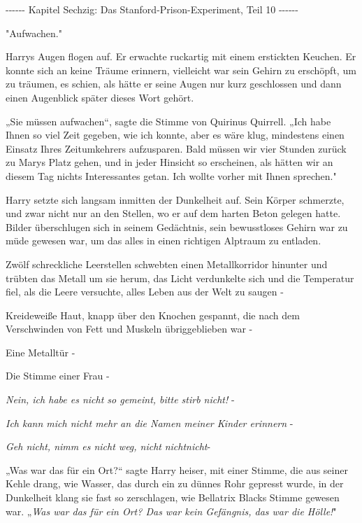 

\hypertarget{das-stanford-prison-experiment-teil-10}{%

-\/-\/-\/-\/-\/- Kapitel Sechzig: Das Stanford-Prison-Experiment, Teil 10 -\/-\/-\/-\/-\/-

"Aufwachen."

Harrys Augen flogen auf. Er erwachte ruckartig mit einem erstickten Keuchen. Er konnte sich an keine Träume erinnern, vielleicht war sein Gehirn zu erschöpft, um zu träumen, es schien, als hätte er seine Augen nur kurz geschlossen und dann einen Augenblick später dieses Wort gehört.

„Sie müssen aufwachen“, sagte die Stimme von Quirinus Quirrell. „Ich habe Ihnen so viel Zeit gegeben, wie ich konnte, aber es wäre klug, mindestens einen Einsatz Ihres Zeitumkehrers aufzusparen. Bald müssen wir vier Stunden zurück zu Marys Platz gehen, und in jeder Hinsicht so erscheinen, als hätten wir an diesem Tag nichts Interessantes getan. Ich wollte vorher mit Ihnen sprechen."

Harry setzte sich langsam inmitten der Dunkelheit auf. Sein Körper schmerzte, und zwar nicht nur an den Stellen, wo er auf dem harten Beton gelegen hatte. Bilder überschlugen sich in seinem Gedächtnis, sein bewusstloses Gehirn war zu müde gewesen war, um das alles in einen richtigen Alptraum zu entladen.

Zwölf schreckliche Leerstellen schwebten einen Metallkorridor hinunter und trübten das Metall um sie herum, das Licht verdunkelte sich und die Temperatur fiel, als die Leere versuchte, alles Leben aus der Welt zu saugen -

Kreideweiße Haut, knapp über den Knochen gespannt, die nach dem Verschwinden von Fett und Muskeln übriggeblieben war -

Eine Metalltür -

Die Stimme einer Frau -

\emph{Nein, ich habe es nicht so gemeint, bitte stirb nicht!} -

\emph{Ich kann mich nicht mehr an die Namen meiner Kinder erinnern} -

\emph{Geh nicht, nimm es nicht weg, nicht} \emph{nichtnicht}-

„Was war das für ein Ort?“ sagte Harry heiser, mit einer Stimme, die aus seiner Kehle drang, wie Wasser, das durch ein zu dünnes Rohr gepresst wurde, in der Dunkelheit klang sie fast so zerschlagen, wie Bellatrix Blacks Stimme gewesen war. „\emph{Was war das für ein Ort? Das war kein Gefängnis, das war die Hölle!}"

}
